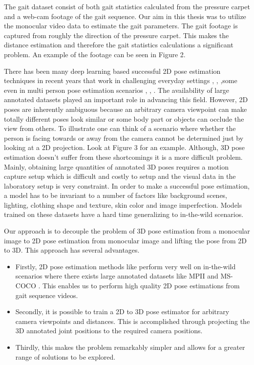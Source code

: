 The gait dataset consist of both gait statistics calculated from the pressure carpet and a web-cam footage of the gait sequence. Our aim in this thesis was to utilize the monocular video data to estimate the gait parameters. The gait footage is captured from roughly the direction of the pressure carpet. This makes the distance estimation and therefore the gait statistics calculations a significant problem. An example of the footage can be seen in Figure 2.

There has been many deep learning based successful 2D pose estimation techniques in recent years that work in challenging everyday settings \parencite{newell2016stacked}, \parencite{chu2017multi}, \parencite{chou2017self} ,some even in multi person pose estimation scenarios \parencite{cao2016realtime}, \parencite{iqbal2017posetrack}, \parencite{insafutdinov2017arttrack}. The availability of large annotated datasets played an important role in advancing this field. However, 2D poses are inherently ambiguous because an arbitrary camera viewpoint can make totally different poses look similar or some body part or objects can occlude the view from others. To illustrate one can think of a scenario where whether the person is facing towards or away from the camera cannot be determined just by looking at a 2D projection. Look at Figure 3 for an example. Although, 3D pose estimation doesn't suffer from these shortcomings it is a more difficult problem. Mainly, obtaining large quantities of annotated 3D poses requires a motion capture setup which is difficult and costly to setup and the visual data in the laboratory setup is very constraint. In order to make a successful pose estimation, a model has to be invariant to a number of factors like background scenes, lighting, clothing shape and texture, skin color and image imperfection. Models trained on these datasets have a hard time generalizing to in-the-wild scenarios.

Our approach is to decouple the problem of 3D pose estimation from a monocular image to 2D pose estimation from monocular image and lifting the pose from 2D to 3D. This approach has several advantages. 
\begin{itemize}
    \item Firstly, 2D pose estimation methods like \parencite{cao2016realtime} perform very well on in-the-wild scenarios where there exists large annotated datasets like MPII \parencite{andriluka20142d} and MS-COCO \parencite{lin2014microsoft}. This enables us to perform high quality 2D pose estimations from gait sequence videos.
    \item Secondly, it is possible to train a 2D to 3D pose estimator for arbitrary camera viewpoints and distances. This is accomplished through projecting the 3D annotated joint positions to the required camera positions.
    \item Thirdly, this makes the problem remarkably simpler and allows for a greater range of solutions to be explored.
\end{itemize}

